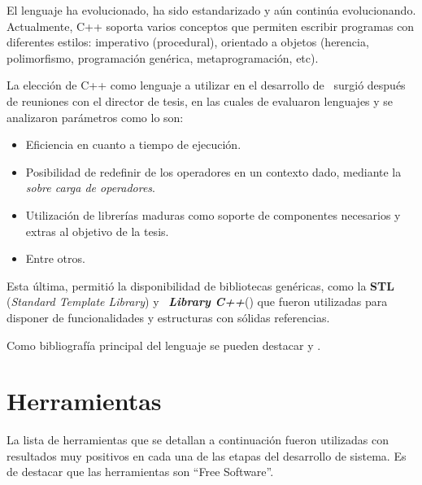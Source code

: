 El lenguaje ha evolucionado, ha sido estandarizado y aún continúa evolucionando. Actualmente, C++ soporta varios conceptos que permiten escribir programas con diferentes estilos: imperativo (procedural), orientado a objetos (herencia, polimorfismo, programación genérica, metaprogramación, etc).

La elección de C++ como lenguaje a utilizar en el desarrollo de \maggen\ surgió después de reuniones con el director de tesis, en las cuales de evaluaron lenguajes y se analizaron parámetros como lo son:

\begin{itemize}
\item Eficiencia en cuanto a tiempo de ejecución.

\item Posibilidad de redefinir de los operadores en un contexto dado, mediante la \textit{sobre carga de operadores}.

\item Utilización de librerías maduras como soporte de componentes necesarios y extras al objetivo de la tesis.

\item Entre otros.
\end{itemize}

Esta última, permitió la disponibilidad de bibliotecas genéricas, como la \textbf{STL} (\textit{Standard Template Library}) y \boost\ \textbf{\textit{Library C++}}(\cite{boost}) que fueron utilizadas para disponer de funcionalidades y estructuras con sólidas referencias.

Como bibliografía principal del lenguaje se pueden destacar \cite{c++1} y \cite{c++2}.

\section{Herramientas}
\label{sec:metoherram}
La lista de herramientas que se detallan a continuación fueron utilizadas con resultados muy positivos en cada una de las etapas del desarrollo de sistema. Es de destacar que las herramientas son ``Free Software''.

